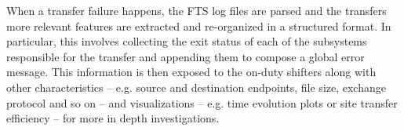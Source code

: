 When a transfer failure happens,
the FTS log files are parsed and the transfers more relevant features are extracted and re-organized in a structured format. 
In particular, this involves collecting the exit status of each of the subsystems responsible for the transfer and appending them to compose a global error message.
This information is then exposed to the on-duty shifters along with other characteristics -- e.g. source and destination endpoints, file size, exchange protocol and so on -- and visualizations -- e.g. time evolution plots or site transfer efficiency -- for more in depth investigations.


